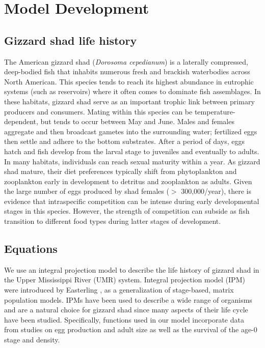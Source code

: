 \documentclass[preprint,review,12pt,authoryear]{elsarticle}
\begin{document}
\section{Model Development}
\subsection{Gizzard shad life history}
The American gizzard shad (\emph{Dorosoma cepedianum}) is a laterally compressed, deep-bodied fish that inhabits numerous fresh and brackish waterbodies across North American. 
This species tends to reach its highest abundance in eutrophic systems (such as reservoirs) where it often comes to dominate fish assemblages. 
In these habitats, gizzard shad serve as an important trophic link between primary producers and consumers. 
Mating within this species can be temperature-dependent, but tends to occur between May and June. Males and females aggregate and then broadcast gametes into the surrounding water; fertilized eggs then settle and adhere to the bottom substrates. After a period of days, eggs hatch and fish develop from the larval stage to juveniles and eventually to adults. In many habitats, individuals can reach sexual maturity within a year. As gizzard shad mature, their diet preferences typically shift from phytoplankton and zooplankton early in development to detritus and zooplankton as adults. Given the large number of eggs produced by shad females ($>$ 300,000/year), there is evidence that intraspecific competition can be intense during early developmental stages in this species. However, the strength of competition can subside as fish transition to different food types during latter stages of development.   

\subsection{Equations}
We use an integral projection model to describe the life history of gizzard shad in the Upper Mississippi River (UMR) system. Integral projection model (IPM) were introduced by Easterling \citep{easterling2000size}, as a generalization of stage-based, matrix population models. IPMs have been used to describe a wide range of organisms \citep{ellner2016data, merow2014advancing, rees2014building} and are a natural choice for gizzard shad since many aspects of their life cycle have been studied. Specifically, functions used in our model incorporate data from studies on egg production and adult size as well as the survival of the age-0 stage and density. 
\end{document}
